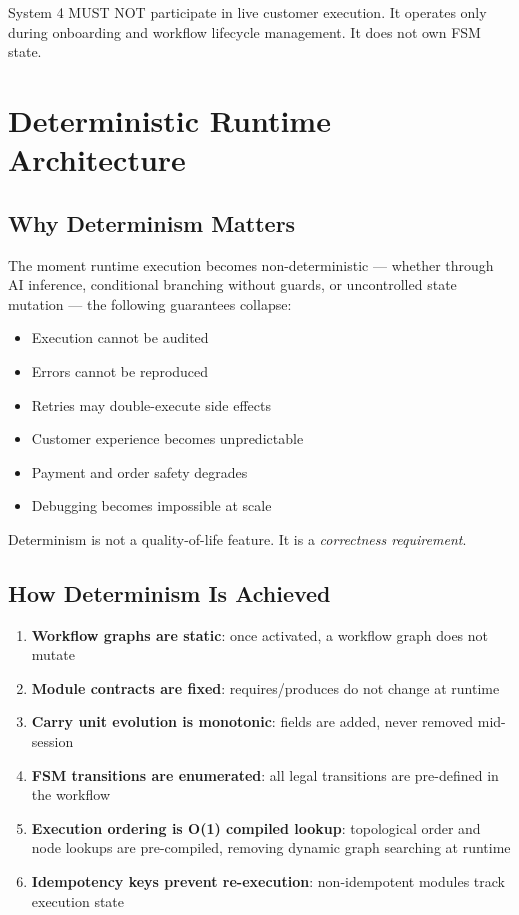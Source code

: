 \documentclass[12pt, a4paper]{report}
\newenvironment{invariantbox}[1]{%
  \begin{tcolorbox}[
    colback=red!4!white,
    colframe=warningred,
    title={\textbf{INVARIANT: #1}},
    fonttitle=\small\bfseries
  ]
}{%
  \end{tcolorbox}
}
\begin{document}
\begin{invariantbox}{System 4 Constraint}
System 4 MUST NOT participate in live customer execution. It operates only during onboarding and workflow lifecycle management. It does not own FSM state.
\end{invariantbox}

\chapter{Deterministic Runtime Architecture}

\section{Why Determinism Matters}

The moment runtime execution becomes non-deterministic --- whether through AI inference, conditional branching without guards, or uncontrolled state mutation --- the following guarantees collapse:

\begin{itemize}
  \item Execution cannot be audited
  \item Errors cannot be reproduced
  \item Retries may double-execute side effects
  \item Customer experience becomes unpredictable
  \item Payment and order safety degrades
  \item Debugging becomes impossible at scale
\end{itemize}

Determinism is not a quality-of-life feature. It is a \textit{correctness requirement}.

\section{How Determinism Is Achieved}

\begin{enumerate}
  \item \textbf{Workflow graphs are static}: once activated, a workflow graph does not mutate
  \item \textbf{Module contracts are fixed}: requires/produces do not change at runtime
  \item \textbf{Carry unit evolution is monotonic}: fields are added, never removed mid-session
  \item \textbf{FSM transitions are enumerated}: all legal transitions are pre-defined in the workflow
  \item \textbf{Execution ordering is O(1) compiled lookup}: topological order and node lookups are pre-compiled, removing dynamic graph searching at runtime
  \item \textbf{Idempotency keys prevent re-execution}: non-idempotent modules track execution state
\end{enumerate}
\end{document}
